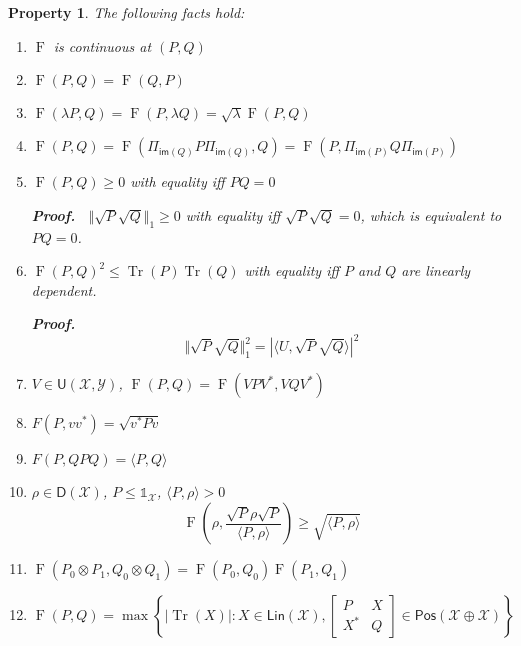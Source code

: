 \documentclass[aps,pra,onecolumn,notitlepage,superscriptaddress]{revtex4-1}
\newcommand{\spc}[1]{\mathcal{#1}}
\newcommand{\Lin}{\mathsf{Lin}}
\newcommand{\Pos}{\mathsf{Pos}}
\newcommand{\D}{\mathsf{D}}
\newcommand{\U}{\mathsf{U}}
\newcommand{\im}{\mathsf{im}}
\def\>{\rangle}
\def\<{\langle}
\newcommand{\Tr}{\operatorname{Tr}}
\newcommand{\op}[1]{\operatorname{#1}}
\newcommand\I{\mathds{1}}
\newtheorem{proper}{Property}
\def\Proof{{\bf Proof.~}}
\begin{document}
    \begin{proper}
        The following facts hold:
        \begin{enumerate}
            \item $\op F$ is continuous at $(P,Q)$
            \item $\op F(P,Q) = \op F(Q,P)$
            \item $\op F(\lambda P,Q) = \op F(P,\lambda Q) = \sqrt \lambda \op F(P,Q)$
            \item $\op F(P,Q) = \op F(\Pi_{\im(Q)} P \Pi_{\im(Q)}, Q) = \op F(P, \Pi_{\im(P)} Q \Pi_{\im(P)})$
            \item $\op F(P,Q) \geq 0$ with equality iff $PQ=0$
            
            \Proof
            $\Vert \sqrt P \sqrt Q \Vert_1 \geq 0$ with equality iff $\sqrt P \sqrt Q = 0$, which is equivalent to $PQ = 0$.

            \item $\op F(P,Q)^2 \leq \Tr(P)\Tr(Q)$ with equality iff $P$ and $Q$ are linearly dependent.
            
            \Proof
            \begin{equation}
                \Vert \sqrt P \sqrt Q \Vert_1^2 = |\< U, \sqrt P \sqrt Q\>|^2
            \end{equation}

            \item $V \in \U(\spc X, \spc Y)$, $\op F(P,Q) = \op F(VPV^*, VQV^*)$
            \item $F(P, vv^*) = \sqrt{v^*Pv}$
            \item $F(P, QPQ) = \< P,Q \>$
            \item $\rho \in \D(\spc X)$, $P \leq \I_\spc X$, $\<P, \rho\> > 0$
            \begin{equation}
                \op F \left(\rho, \frac{\sqrt P \rho \sqrt P}{\< P, \rho \>} \right) \geq \sqrt{ \< P,\rho \> }
            \end{equation}
            \item $\op F(P_0 \otimes P_1, Q_0 \otimes Q_1) = \op F(P_0, Q_0) \op F(P_1, Q_1)$
            \item \begin{equation}
                \op F(P, Q) = \max \left\{ |\Tr(X)| : X \in \Lin(\spc X), \begin{bmatrix}
                    P & X \\
                    X^* & Q
                \end{bmatrix} \in \Pos(\spc X \oplus \spc X) \right\}
            \end{equation}
        \end{enumerate}
    \end{proper}
\end{document}
